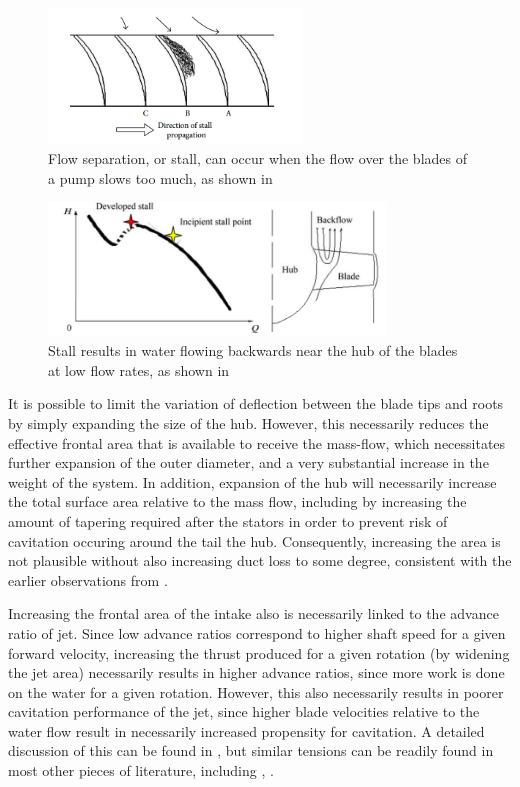 \documentclass{article}\usepackage[]{graphicx}\usepackage[]{color}
\begin{document}
\begin{figure}[h]
\captionsetup{width=0.6\textwidth}
\includegraphics[width=0.6\textwidth, center]{stall.png}
\caption{Flow separation, or stall, can occur when the flow over the blades of a pump slows too much, as shown in \cite{li2013}}
\label{fig:stall.png}
\end{figure}

\begin{figure}[h]
\captionsetup{width=0.8\textwidth}
\includegraphics[width=0.8\textwidth, center]{backflow.png}
\caption{Stall results in water flowing backwards near the hub of the blades at low flow rates, as shown in \cite{li2014rotating}}
\label{fig:backflow.png}
\end{figure}

It is possible to limit the variation of deflection between the blade tips and roots by simply expanding the size of the hub.  However, this necessarily reduces the effective frontal area that is available to receive the mass-flow, which necessitates further expansion of the outer diameter, and a very substantial increase in the weight of the system.  In addition, expansion of the hub will necessarily increase the total surface area relative to the mass flow, including by increasing the amount of tapering required after the stators in order to prevent risk of cavitation occuring around the tail the hub.  Consequently, increasing the area is not plausible without also increasing duct loss to some degree, consistent with the earlier observations from \cite{henderson1964}.

Increasing the frontal area of the intake also is necessarily linked to the advance ratio of jet.  Since low advance ratios correspond to higher shaft speed for a given forward velocity, increasing the thrust produced for a given rotation (by widening the jet area) necessarily results in higher advance ratios, since more work is done on the water for a given rotation. However, this also necessarily results in poorer cavitation performance of the jet, since higher blade velocities relative to the water flow result in necessarily increased propensity for cavitation.  A detailed discussion of this can be found in \cite{gearhart1966selection}, but similar tensions can be readily found in most other pieces of literature, including \cite{henderson1964}, \cite{wislicenus1973}.
\end{document}
